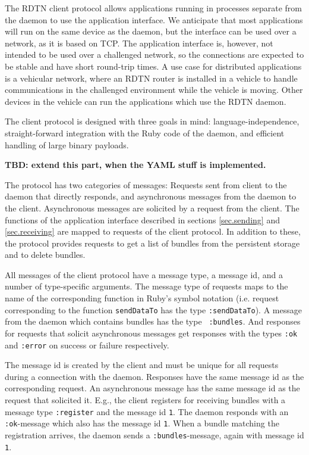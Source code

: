 \documentclass{article}
\begin{document}
The RDTN client protocol allows applications running in processes separate from
the daemon to use the application interface. We anticipate that most
applications will run on the same device as the daemon, but the interface can be
used over a network, as it is based on TCP. The application interface is,
however, not intended to be used over a challenged network, so the connections
are expected to be stable and have short round-trip times. A use case for
distributed applications is a vehicular network, where an RDTN router is
installed in a vehicle to handle communications in the challenged environment
while the vehicle is moving. Other devices in the vehicle can run the
applications which use the RDTN daemon.

The client protocol is designed with three goals in mind: language-independence,
straight-forward integration with the Ruby code of the daemon, and efficient
handling of large binary payloads. 

{\bf TBD: extend this part, when the YAML stuff is implemented.}

The protocol has two categories of messages: Requests sent from client to the
daemon that directly responds, and asynchronous messages from the daemon to the
client. Asynchronous messages are solicited by a request from the client. The
functions of the application interface described in sections \ref{sec.sending}
and \ref{sec.receiving} are mapped to requests of the client protocol. In
addition to these, the protocol provides requests to get a list of bundles from
the persistent storage and to delete bundles.

All messages of the client protocol have a message type, a message id, and a
number of type-specific arguments. The message type of requests maps to the name
of the corresponding function in Ruby's symbol notation (i.e. request
corresponding to the function {\tt sendDataTo} has the type {\tt :sendDataTo}).
A message from the daemon which contains bundles has the type {\tt
:bundles}. And responses for requests that solicit asynchronous messages get
responses with the types {\tt :ok} and {\tt :error} on success or failure
respectively.

The message id is created by the client and must be unique for all requests
during a connection with the daemon. Responses have the same message id as the
corresponding request. An asynchronous message has the same message id as the
request that solicited it. E.g., the client registers for receiving bundles with
a message type {\tt :register} and the message id {\tt 1}. The daemon responds
with an {\tt :ok}-message which also has the message id {\tt 1}. When a bundle
matching the registration arrives, the daemon sends a {\tt :bundles}-message,
again with message id {\tt 1}.
\end{document}
